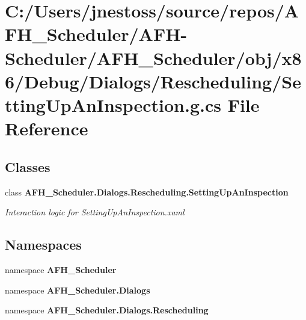 \section{C\+:/\+Users/jnestoss/source/repos/\+A\+F\+H\+\_\+\+Scheduler/\+A\+F\+H-\/\+Scheduler/\+A\+F\+H\+\_\+\+Scheduler/obj/x86/\+Debug/\+Dialogs/\+Rescheduling/\+Setting\+Up\+An\+Inspection.g.\+cs File Reference}
\label{x86_2_debug_2_dialogs_2_rescheduling_2_setting_up_an_inspection_8g_8cs}
\subsection*{Classes}
\begin{DoxyCompactItemize}
\item 
class \textbf{ A\+F\+H\+\_\+\+Scheduler.\+Dialogs.\+Rescheduling.\+Setting\+Up\+An\+Inspection}
\begin{DoxyCompactList}\small\item\em Interaction logic for Setting\+Up\+An\+Inspection.\+xaml \end{DoxyCompactList}\end{DoxyCompactItemize}
\subsection*{Namespaces}
\begin{DoxyCompactItemize}
\item 
namespace \textbf{ A\+F\+H\+\_\+\+Scheduler}
\item 
namespace \textbf{ A\+F\+H\+\_\+\+Scheduler.\+Dialogs}
\item 
namespace \textbf{ A\+F\+H\+\_\+\+Scheduler.\+Dialogs.\+Rescheduling}
\end{DoxyCompactItemize}
